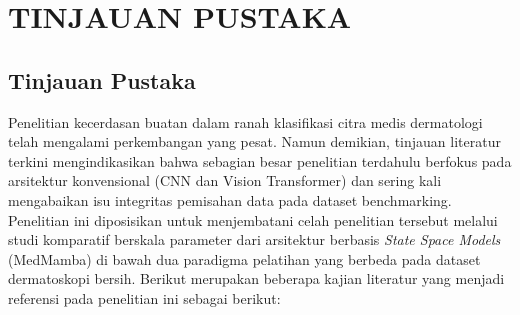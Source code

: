 \newpage
\chapter{TINJAUAN PUSTAKA} \label{Bab II}

\section{Tinjauan Pustaka} \label{II.Tinjauan}
Penelitian kecerdasan buatan dalam ranah klasifikasi citra medis dermatologi telah mengalami perkembangan yang pesat. Namun demikian, tinjauan literatur terkini mengindikasikan bahwa sebagian besar penelitian terdahulu berfokus pada arsitektur konvensional (CNN dan Vision Transformer) dan sering kali mengabaikan isu integritas pemisahan data pada dataset benchmarking. Penelitian ini diposisikan untuk menjembatani celah penelitian tersebut melalui studi komparatif berskala parameter dari arsitektur berbasis \textit{State Space Models} (MedMamba) di bawah dua paradigma pelatihan yang berbeda pada dataset dermatoskopi bersih. Berikut merupakan beberapa kajian literatur yang menjadi referensi pada penelitian ini sebagai berikut: \par

